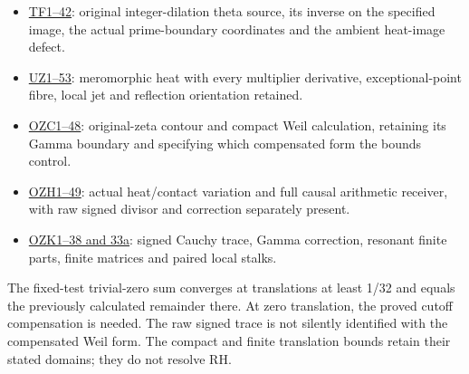 \documentclass[
]{article}
\providecommand{\tightlist}{%
  \setlength{\itemsep}{0pt}\setlength{\parskip}{0pt}}
\begin{document}
\begin{itemize}
\tightlist
\item
  \href{https://github.com/KokunoYumeto/zeta-function-research-reader/blob/a8e35be8f238913ae5bcbd8ad55a07d539b350f3/workbenches/splitzero-tandem/branches/tau-zero-prime-positivity/FAITHFUL_THETA_COMPLETION_RETURN.tex}{TF1--42}:
  original integer-dilation theta source, its inverse on the specified
  image, the actual prime-boundary coordinates and the ambient
  heat-image defect.
\item
  \href{https://github.com/KokunoYumeto/zeta-function-research-reader/blob/a8e35be8f238913ae5bcbd8ad55a07d539b350f3/workbenches/splitzero-tandem/branches/tau-zero-prime-positivity/FAITHFUL_UNCOMPLETED_ZETA_HEAT.tex}{UZ1--53}:
  meromorphic heat with every multiplier derivative, exceptional-point
  fibre, local jet and reflection orientation retained.
\item
  \href{https://github.com/KokunoYumeto/zeta-function-research-reader/blob/a8e35be8f238913ae5bcbd8ad55a07d539b350f3/workbenches/splitzero-tandem/branches/tau-zero-prime-positivity/ORIGINAL_ZETA_COMPACT_WEIL_RECONSTRUCTION.tex}{OZC1--48}:
  original-zeta contour and compact Weil calculation, retaining its
  Gamma boundary and specifying which compensated form the bounds
  control.
\item
  \href{https://github.com/KokunoYumeto/zeta-function-research-reader/blob/a8e35be8f238913ae5bcbd8ad55a07d539b350f3/workbenches/splitzero-tandem/branches/tau-zero-prime-positivity/ORIGINAL_ZETA_HEAT_CONTACT_RECONSTRUCTION.tex}{OZH1--49}:
  actual heat/contact variation and full causal arithmetic receiver,
  with raw signed divisor and correction separately present.
\item
  \href{https://github.com/KokunoYumeto/zeta-function-research-reader/blob/a8e35be8f238913ae5bcbd8ad55a07d539b350f3/workbenches/splitzero-tandem/branches/tau-zero-prime-positivity/ORIGINAL_ZETA_CAUCHY_RECONSTRUCTION.tex}{OZK1--38
  and 33a}: signed Cauchy trace, Gamma correction, resonant finite
  parts, finite matrices and paired local stalks.
\end{itemize}

The fixed-test trivial-zero sum converges at translations at least 1/32
and equals the previously calculated remainder there. At zero
translation, the proved cutoff compensation is needed. The raw signed
trace is not silently identified with the compensated Weil form. The
compact and finite translation bounds retain their stated domains; they
do not resolve RH.
\end{document}
